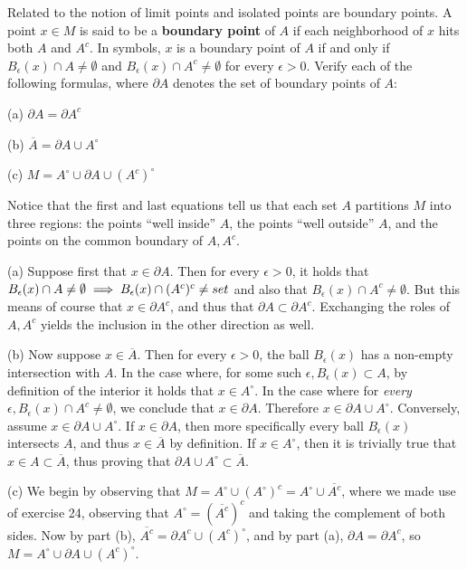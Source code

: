 \begin{exercise}{41}
    Related to the notion of limit points and isolated points are boundary points.
    A point $x \in M$ is said to be a \textbf{boundary point} of $A$ if each neighborhood of $x$ hits both $A$ and $A^c$.
    In symbols, $x$ is a boundary point of $A$ if and only if $B_{\epsilon}(x) \cap A \neq \emptyset$ and $B_{\epsilon}(x) \cap A^c \neq \emptyset$ for every $\epsilon > 0$.
    Verify each of the following formulas, where $\partial A$ denotes the set of boundary points of $A$:

    (a) $\partial A = \partial A^c$

    (b) $\overline{{A}} = \partial A \cup A^{\circ}$

    (c) $M = A^\circ \cup \partial A \cup ({A^{c}})^{\circ}$

    Notice that the first and last equations tell us that each set $A$ partitions $M$ into three regions: the points ``well inside'' $A$, the points ``well outside'' $A$, and the points on the common boundary of $A, A^{c}$.
\end{exercise}

\begin{solution}
    
    (a) Suppose first that $x \in \partial A$.
    Then for every $\epsilon > 0$, it holds that $B_{\epsilon}(x) \cap A \neq \emptyset \implies B_{\epsilon}(x) \cap (A^c)^c \neq \empty set$ and also that $B_{\epsilon}(x) \cap A^c \neq \emptyset$.
    But this means of course that $x \in \partial A^c$, and thus that $\partial A \subset \partial A^c$.
    Exchanging the roles of $A, A^c$ yields the inclusion in the other direction as well.

    (b) Now suppose $x \in \overline{A}$.
    Then for every $\epsilon > 0$, the ball $B_{\epsilon}(x)$ has a non-empty intersection with $A$.
    In the case where, for some such $\epsilon, B_{\epsilon}(x) \subset A$, by definition of the interior it holds that $x \in A^\circ$.
    In the case where for \textit{every} $\epsilon, B_{\epsilon}(x) \cap A^c \neq \emptyset$, we conclude that $x \in \partial A$.
    Therefore $x \in \partial A \cup A^\circ$.
    Conversely, assume $x \in \partial A \cup A^\circ$.
    If $x \in \partial A$, then more specifically every ball $B_{\epsilon}(x)$ intersects $A$, and thus $x \in \overline{A}$ by definition.
    If $x \in A^\circ$, then it is trivially true that $x \in A \subset \overline{A}$, thus proving that $\partial A \cup A^\circ \subset \overline{A}$.

    (c) We begin by observing that $M = A^\circ \cup (A^\circ)^c = A^\circ \cup \overline{A^c}$, where we made use of exercise 24, observing that $A^\circ = (\overline{A^c})^c$ and taking the complement of both sides.
    Now by part (b), $\overline{A^c} = \partial A^c \cup (A^c)^\circ$, and by part (a), $\partial A = \partial A^c$, so $M = A^\circ \cup \partial A \cup (A^c)^\circ$.
\end{solution}


